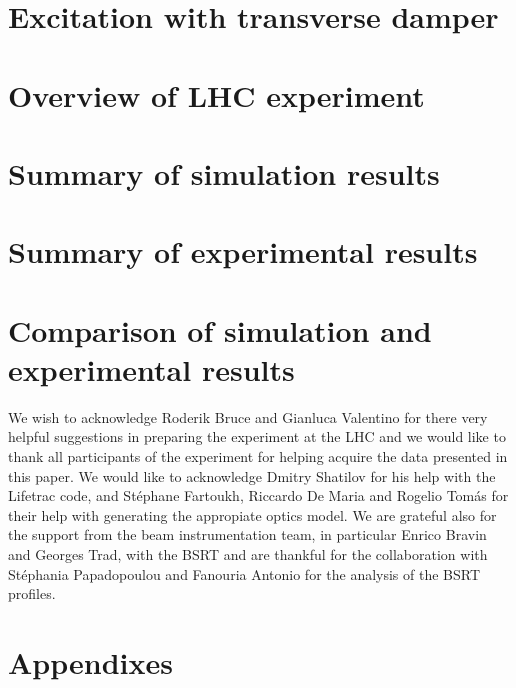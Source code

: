 \documentclass[%
 reprint,
 amsmath,amssymb,
 aps,
prstab,
]{revtex4-1}
\begin{document}
\section{\label{sec:adt}Excitation with transverse damper}

\section{\label{sec:exp_sum}Overview of LHC experiment}

\section{\label{sec:sim}Summary of simulation results}

\section{\label{sec:exp}Summary of experimental results}

\section{\label{sec:exp_sim}Comparison of simulation and experimental results}

\begin{acknowledgments}
We wish to acknowledge Roderik Bruce and Gianluca Valentino for there very helpful suggestions in preparing the experiment at the LHC and we would like to thank all participants of the experiment for helping acquire the data presented in this paper. We would like to acknowledge Dmitry Shatilov for his help with the Lifetrac code, and St\'{e}phane Fartoukh, Riccardo De Maria and Rogelio Tomás for their help with generating the appropiate optics model. We are grateful also for the support from the beam instrumentation team, in particular Enrico Bravin and Georges Trad, with the BSRT and are thankful for the collaboration with St\'{e}phania Papadopoulou and Fanouria Antonio for the analysis of the BSRT profiles.
\end{acknowledgments}

\appendix

\section{Appendixes}


\end{document}
